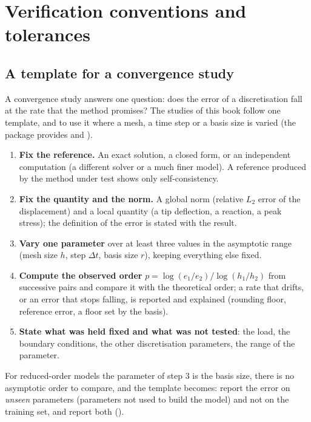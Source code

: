 \chapter{Verification conventions and tolerances}\label{ch:conv}

\section{A template for a convergence study}\label{sec:conv-template}

A convergence study answers one question: does the error of a discretisation fall at the rate that the method promises? The studies of this book follow one template, and  to  use it where a mesh, a time step or a basis size is varied (the package provides  and ).

\begin{enumerate}
\item \textbf{Fix the reference.} An exact solution, a closed form, or an independent computation (a different solver or a much finer model). A reference produced by the method under test shows only self-consistency.
\item \textbf{Fix the quantity and the norm.} A global norm (relative $L_2$ error of the displacement) and a local quantity (a tip deflection, a reaction, a peak stress); the definition of the error is stated with the result.
\item \textbf{Vary one parameter} over at least three values in the asymptotic range (mesh size $h$, step $\Delta t$, basis size $r$), keeping everything else fixed.
\item \textbf{Compute the observed order} $p=\log(e_1/e_2)/\log(h_1/h_2)$ from successive pairs and compare it with the theoretical order; a rate that drifts, or an error that stops falling, is reported and explained (rounding floor, reference error, a floor set by the basis).
\item \textbf{State what was held fixed and what was not tested}: the load, the boundary conditions, the other discretisation parameters, the range of the parameter.
\end{enumerate}

For reduced-order models the parameter of step 3 is the basis size, there is no asymptotic order to compare, and the template becomes: report the error on \emph{unseen} parameters (parameters not used to build the model) and not on the training set, and report both ().

